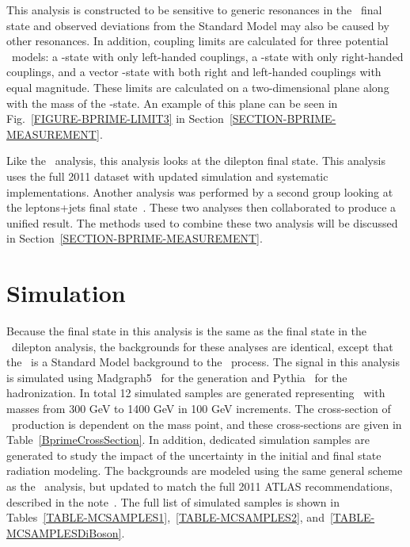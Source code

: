 
This analysis is constructed to be sensitive to generic resonances in the \Wt\ final state and observed deviations from the Standard Model may also be caused by other resonances. In addition, coupling limits are calculated for three potential \bstar\ models: a \bstar-state with only left-handed couplings, a \bstar-state with only right-handed couplings, and a vector \bstar-state with both right and left-handed couplings with equal magnitude. These limits are calculated on a two-dimensional plane along with the mass of the \bstar-state. An example of this plane can be seen in Fig.~\ref{FIGURE-BPRIME-LIMIT3} in Section~\ref{SECTION-BPRIME-MEASUREMENT}.

Like the \Wtchan\ analysis, this analysis looks at the dilepton final state. This analysis uses the full 2011 dataset with updated simulation and systematic implementations. Another analysis was performed by a second group looking at the leptons+jets final state~\cite{BSTAR-LEPJETS}. These two analyses then collaborated to produce a unified result. The methods used to combine these two analysis will be discussed in Section~\ref{SECTION-BPRIME-MEASUREMENT}.

\section{Simulation}
\label{SECTION-BPRIME-SIMULATION}
Because the final state in this analysis is the same as the final state in the \Wtchan\ dilepton analysis, the backgrounds for these analyses are identical, except that the \Wtchan\ is a Standard Model background to the \bstar\ process. The signal in this analysis is simulated using Madgraph5~\cite{MADGRAPH} for the generation and Pythia~\cite{PYTHIA} for the hadronization. In total 12 simulated samples are generated representing \bstar\ with masses from 300 GeV to 1400 GeV in 100 GeV increments. The cross-section of \bstar\ production is dependent on the mass point, and these cross-sections are given in Table~\ref{BprimeCrossSection}. In addition, dedicated simulation samples are generated to study the impact of the uncertainty in the initial and final state radiation modeling.
The backgrounds are modeled using the same general scheme as the \Wt\ analysis, but updated to match the full 2011 ATLAS recommendations, described in the note~\cite{BPRIMEINT}. The full list of simulated samples is shown in Tables~\ref{TABLE-MCSAMPLES1},~\ref{TABLE-MCSAMPLES2}, and~\ref{TABLE-MCSAMPLESDiBoson}.



